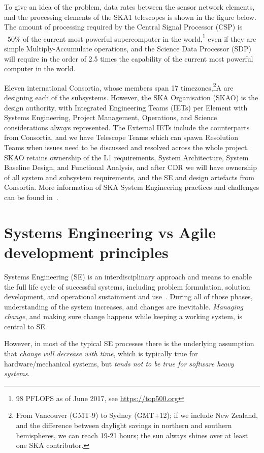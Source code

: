 \documentclass[11pt,twoside]{article}
\begin{document}
To give an idea of the problem, data rates between the sensor network elements, and the processing elements of the SKA1 telescopes is shown in the figure below. The amount of processing required by the Central Signal Processor (CSP) is ~50\% of the current most powerful supercomputer in the world,\footnote{98 PFLOPS as of June 2017, see \url{https://top500.org}} even if they are simple Multiply-Accumulate operations, and the Science Data Processor (SDP) will require in the order of 2.5 times the capability of the current most powerful computer in the world. 

Eleven international Consortia, whose members span 17 timezones,\footnote{From Vancouver (GMT-9) to Sydney (GMT+12); if we include New Zealand, and the difference between daylight savings in northern and southern hemispheres, we can reach 19-21 hours; the sun always shines over at least one SKA contributor.}A are designing each of the subsystems.
However, the SKA Organisation (SKAO) is the design authority, with Integrated Engineering Teams (IETs) per Element with Systems Engineering, Project Management, Operations, and Science considerations always represented. The External IETs include the counterparts from Consortia, and we have Telescope Teams which can spawn Resolution Teams when issues need to be discussed and resolved across the whole project.
SKAO retains ownership of the L1 requirements, System Architecture, System Baseline Design, and Functional Analysis, and after CDR we will have ownership of all system and subsystem requirements, and the SE and design artefacts from Consortia.
More information of SKA System Engineering practices and challenges can be found in~\citep{2016SPIE.9911E..0WC}.


\section{Systems Engineering vs Agile development principles} %
\label{sec:se_vs_agile_development_principles}
Systems Engineering (SE) is an interdisciplinary approach and means to enable the full life cycle of successful systems, including problem formulation, solution development, and operational sustainment and use~\citep{INCOSE-TP-2003-002-04}. During all of those phases, understanding of the system increases, and changes are inevitable. \emph{Managing change}, and making sure change happens while keeping a working system, is central to SE.

However, in most of the typical SE processes there is the underlying assumption that \emph{change will decrease with time}, which is typically true for hardware/mechanical systems, but \emph{tends not to be true for software heavy systems}. 
\end{document}

